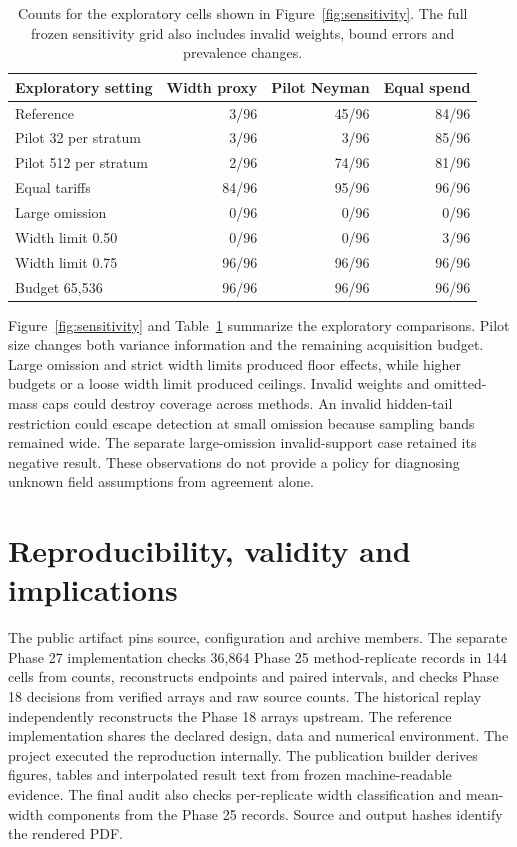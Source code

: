 \documentclass[article,nojss]{jss}
\begin{document}
\begin{table}[!t]
\centering
\small
\begin{tabular}{lrrr}
\hline
Exploratory setting & Width proxy & Pilot Neyman & Equal spend \\
\hline
Reference & 3/96 & 45/96 & 84/96 \\
Pilot 32 per stratum & 3/96 & 3/96 & 85/96 \\
Pilot 512 per stratum & 2/96 & 74/96 & 81/96 \\
Equal tariffs & 84/96 & 95/96 & 96/96 \\
Large omission & 0/96 & 0/96 & 0/96 \\
Width limit 0.50 & 0/96 & 0/96 & 3/96 \\
Width limit 0.75 & 96/96 & 96/96 & 96/96 \\
Budget 65,536 & 96/96 & 96/96 & 96/96 \\
\hline
\end{tabular}
\caption{Counts for the exploratory cells shown in Figure~\ref{fig:sensitivity}. The full frozen sensitivity grid also includes invalid weights, bound errors and prevalence changes.}
\label{tab:sensitivity}
\end{table}

Figure~\ref{fig:sensitivity} and Table~\ref{tab:sensitivity} summarize
the exploratory comparisons. Pilot size changes both variance information
and the remaining acquisition budget. Large omission and strict width limits produced floor effects,
while higher budgets or a loose width limit produced ceilings. Invalid
weights and omitted-mass caps could destroy coverage across methods. An
invalid hidden-tail restriction could escape detection at small omission
because sampling bands remained wide. The separate large-omission
invalid-support case retained its negative result. These observations do
not provide a policy for diagnosing unknown field assumptions from
agreement alone.

\section{Reproducibility, validity and implications}

The public artifact pins source, configuration and archive members. The
separate Phase 27 implementation checks 36,864 Phase 25 method-replicate
records in 144 cells from counts, reconstructs endpoints and paired
intervals, and checks Phase 18 decisions from verified arrays and raw
source counts. The historical replay independently reconstructs the
Phase 18 arrays upstream. The reference implementation shares the
declared design, data and numerical environment. The project executed
the reproduction internally. The publication builder derives figures,
tables and interpolated result text from frozen machine-readable
evidence. The final audit also checks per-replicate width classification
and mean-width components from the Phase 25 records. Source and output
hashes identify the rendered PDF.
\end{document}
